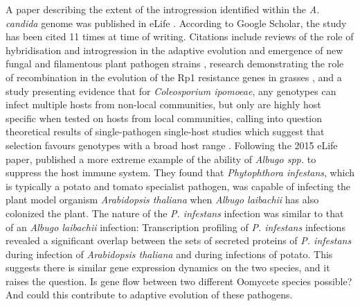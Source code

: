 A paper describing the extent of the introgression identified within the \textit{A. candida} genome was published in eLife \parencite{McMullan2015a}.
According to Google Scholar, the study has been cited 11 times at time of writing.
Citations include reviews of the role of hybridisation and introgression in the adaptive evolution and emergence of new fungal and filamentous plant pathogen strains \parencite{Depotter2016,Dong2015,Stukenbrock2016}, research demonstrating the role of recombination in the evolution of the Rp1 resistance genes in grasses \parencite{Jouet2015}, and a study presenting evidence that for \textit{Coleosporium ipomoeae}, any genotypes can infect multiple hosts from non-local communities, but only are highly host specific when tested on hosts from local communities, calling into question theoretical results of single-pathogen single-host studies which suggest that selection favours genotypes with a broad host range \parencite{Chappell2016}.
Following the 2015 eLife paper, \cite{Belhaj2015} published a more extreme example of the ability of \textit{Albugo spp.} to suppress the host immune system.
They found that \textit{Phytophthora infestans}, which is typically a potato and tomato specialist pathogen, was capable of infecting the plant model organism \textit{Arabidopsis thaliana} when \textit{Albugo laibachii} has also colonized the plant.
The nature of the \textit{P. infestans} infection was similar to that of an \textit{Albugo laibachii} infection: Transcription profiling of \textit{P. infestans} infections revealed a significant overlap between the sets of secreted proteins of \textit{P. infestans} during infection of \textit{Arabidopsis thaliana} and during infections of potato.
This suggests there is similar gene expression dynamics on the two species, and it raises the question.
Is gene flow between two different Oomycete species possible? And could this contribute to adaptive evolution of these pathogens.

